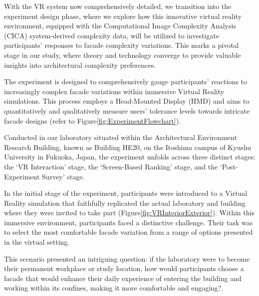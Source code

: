 %    

With the VR system now comprehensively detailed, we transition into the experiment design phase, where we explore how this innovative virtual reality environment, equipped with the Computational Image Complexity Analysis (CICA) system-derived complexity data, will be utilized to investigate participants' responses to facade complexity variations.
This marks a pivotal stage in our study, where theory and technology converge to provide valuable insights into architectural complexity preferences.

The experiment is designed to comprehensively gauge participants' reactions to increasingly complex facade variations within immersive Virtual Reality simulations.
This process employs a Head-Mounted Display (HMD) and aims to quantitatively and qualitatively measure users' tolerance levels towards intricate facade designs (refer to Figure\ref{fig:ExperimentFlowchart}).

Conducted in our laboratory situated within the Architectural Environment Research Building, known as Building HE20, on the Itoshima campus of Kyushu University in Fukuoka, Japan, the experiment unfolds across three distinct stages: the `VR Interaction' stage, the `Screen-Based Ranking' stage, and the `Post-Experiment Survey' stage.




In the initial stage of the experiment, participants were introduced to a Virtual Reality simulation that faithfully replicated the actual laboratory and building where they were invited to take part (Figure\ref{fig:VRInteriorExterior}).
Within this immersive environment, participants faced a distinctive challenge.
Their task was to select the most comfortable facade variation from a range of options presented in the virtual setting.

This scenario presented an intriguing question: if the laboratory were to become their permanent workplace or study location, how would participants choose a facade that would enhance their daily experience of entering the building and working within its confines, making it more comfortable and engaging?.

